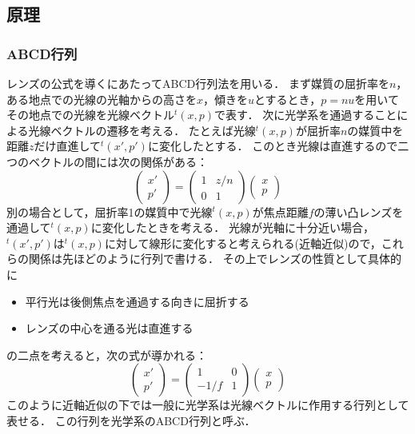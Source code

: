\documentclass[titlepage]{jsarticle}
\begin{document}
\subsection{原理}
\subsubsection{ABCD行列}
レンズの公式を導くにあたってABCD行列法を用いる．
まず媒質の屈折率を$n$，ある地点での光線の光軸からの高さを$x$，傾きを$u$とするとき，$p=nu$を用いてその地点での光線を光線ベクトル$^t(x,p)$で表す．
次に光学系を通過することによる光線ベクトルの遷移を考える．
たとえば光線$^t(x,p)$が屈折率$n$の媒質中を距離$z$だけ直進して$^t(x',p')$に変化したとする．
このとき光線は直進するので二つのベクトルの間には次の関係がある：
\begin{equation}
    \left(
    \begin{array}{c}
        x' \\
        p'
    \end{array}
    \right)=\left(
    \begin{array}{cc}
        1 & z/n \\
        0 & 1
    \end{array}
    \right)\left(
    \begin{array}{c}
        x  \\
        p 
    \end{array}
    \right) \label{straight}
\end{equation}
別の場合として，屈折率1の媒質中で光線$^t(x,p)$が焦点距離$f$の薄い凸レンズを通過して$^t(x,p)$に変化したときを考える．
光線が光軸に十分近い場合，$^t(x',p')$は$^t(x,p)$に対して線形に変化すると考えられる(近軸近似)ので，これらの関係は先ほどのように行列で書ける．
その上でレンズの性質として具体的に
\begin{itemize}
    \item 平行光は後側焦点を通過する向きに屈折する
    \item レンズの中心を通る光は直進する
\end{itemize}
の二点を考えると，次の式が導かれる：
\begin{equation}
    \left(
    \begin{array}{c}
        x' \\
        p'
    \end{array}
    \right)=\left(
    \begin{array}{cc}
        1 & 0 \\
        -1/f & 1
    \end{array}
    \right)\left(
    \begin{array}{c}
        x  \\
        p 
    \end{array}
    \right) \label{lens}
\end{equation}
このように近軸近似の下では一般に光学系は光線ベクトルに作用する行列として表せる．
この行列を光学系のABCD行列と呼ぶ．
\end{document}
